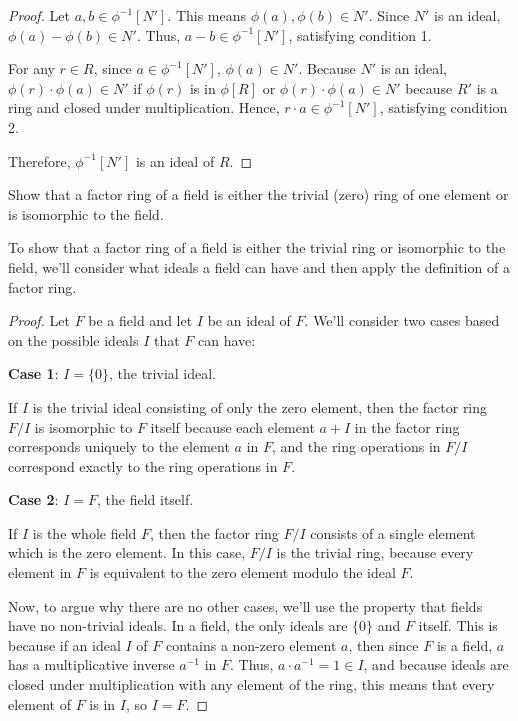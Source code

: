 \documentclass[12pt]{amsart}
\theoremstyle{definition}
\numberwithin{equation}{section}
\theoremstyle{plain}
\begin{document}
\begin{exercise}{22}
\begin{proof}
    Let \( a, b \in \phi^{-1}[N'] \). This means \( \phi(a), \phi(b) \in N' \). Since \( N' \) is an ideal, \( \phi(a) - \phi(b) \in N' \). Thus, \( a - b \in \phi^{-1}[N'] \), satisfying condition 1.
    
    For any \( r \in R \), since \( a \in \phi^{-1}[N'] \), \( \phi(a) \in N' \). Because \( N' \) is an ideal, \( \phi(r) \cdot \phi(a) \in N' \) if \( \phi(r) \) is in \( \phi[R] \) or \( \phi(r) \cdot \phi(a) \in N' \) because \( R' \) is a ring and closed under multiplication. Hence, \( r \cdot a \in \phi^{-1}[N'] \), satisfying condition 2.
    
    Therefore, \( \phi^{-1}[N'] \) is an ideal of \( R \).
\end{proof}    
\end{exercise}
\vspace*{20pt}
\begin{exercise}{24} Show that a factor ring of a field is either the trivial (zero) ring of one element or is isomorphic to the field.
 
    To show that a factor ring of a field is either the trivial ring or isomorphic to the field, we'll consider what ideals a field can have and then apply the definition of a factor ring.

\begin{proof}
    
    Let \( F \) be a field and let \( I \) be an ideal of \( F \). We'll consider two cases based on the possible ideals \( I \) that \( F \) can have:
    
    \textbf{Case 1}: \( I = \{0\} \), the trivial ideal.
    
    If \( I \) is the trivial ideal consisting of only the zero element, then the factor ring \( F/I \) is isomorphic to \( F \) itself because each element \( a + I \) in the factor ring corresponds uniquely to the element \( a \) in \( F \), and the ring operations in \( F/I \) correspond exactly to the ring operations in \( F \).
    
    \textbf{Case 2}: \( I = F \), the field itself.
    
    If \( I \) is the whole field \( F \), then the factor ring \( F/I \) consists of a single element which is the zero element. In this case, \( F/I \) is the trivial ring, because every element in \( F \) is equivalent to the zero element modulo the ideal \( F \).
    
    Now, to argue why there are no other cases, we'll use the property that fields have no non-trivial ideals. In a field, the only ideals are \( \{0\} \) and \( F \) itself. This is because if an ideal \( I \) of \( F \) contains a non-zero element \( a \), then since \( F \) is a field, \( a \) has a multiplicative inverse \( a^{-1} \) in \( F \). Thus, \( a \cdot a^{-1} = 1 \in I \), and because ideals are closed under multiplication with any element of the ring, this means that every element of \( F \) is in \( I \), so \( I = F \).
    

\end{proof}
\end{exercise}
\end{document}
